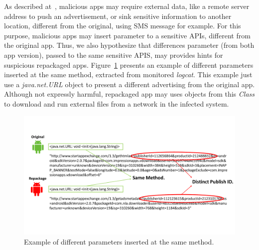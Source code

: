 As described at~\cite{le2018towards}, malicious apps may require external data, like a remote server address to push an advertisement, or sink sensitive information to another location, different from the original, using SMS message for example. For this purpose, malicious apps may insert parameter to a sensitive APIs, different from the original app. Thus, we also hypothesize that differences parameter (from both app version), passed to the same sensitive APIS, may provides hints for suspicious repackaged apps. Figure~\ref{fig:parameterDiff} presents an example of different parameters inserted at the same method, extracted from monitored \textit{logcat}. This example just use a \textit{java.net.URL} object to present a different advertising from the original app. Although not expressly harmful, repackaged app may uses objects from this \textit{Class} to download and run external files from a network in the infected system\cite{DBLP:journals/compsec/ObaidatSPP22}.



\begin{figure}[t]
\centering
\includegraphics[scale=0.3]{images/parameterDiff.pdf}
\caption{Example of different parameters inserted at the same method.}
 \label{fig:parameterDiff}
\end{figure}